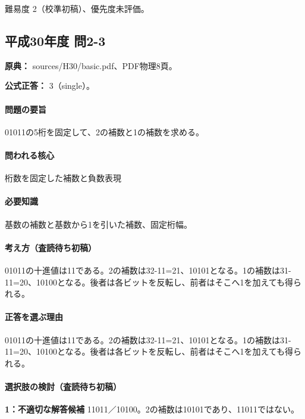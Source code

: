 \par 難易度 2（校準初稿）、優先度未評価。

\subsection{平成30年度 問2-3}
\label{q:h30-reg-basic-2-3}

\noindent\textbf{原典：} sources/H30/basic.pdf、PDF物理8頁。

\textbf{公式正答：} 3（single）。

\paragraph{問題の要旨} 01011の5桁を固定して、2の補数と1の補数を求める。

\paragraph{問われる核心} 桁数を固定した補数と負数表現

\paragraph{必要知識} 基数の補数と基数から1を引いた補数、固定桁幅。

\paragraph{考え方（査読待ち初稿）} 01011の十進値は11である。2の補数は32-11=\allowbreak{}21、10101となる。1の補数は31-11=\allowbreak{}20、10100となる。後者は各ビットを反転し、前者はそこへ1を加えても得られる。

\paragraph{正答を選ぶ理由} 01011の十進値は11である。2の補数は32-11=\allowbreak{}21、10101となる。1の補数は31-11=\allowbreak{}20、10100となる。後者は各ビットを反転し、前者はそこへ1を加えても得られる。

\paragraph{選択肢の検討（査読待ち初稿）}\mbox{}\par

\noindent\textbf{1：不適切な解答候補} 11011／10100。2の補数は10101であり、11011ではない。\par

